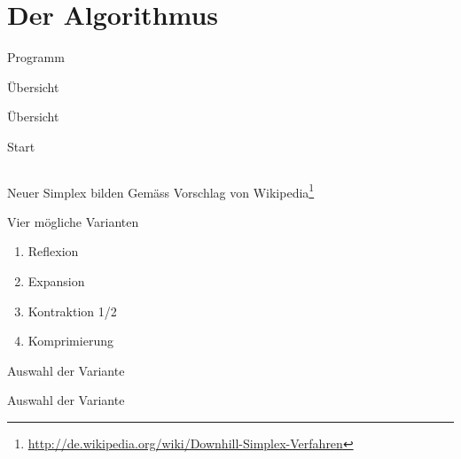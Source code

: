 \section{Der Algorithmus} 
\begin{frame}{Programm}\tableofcontents[currentsection]\end{frame}

\begin{frame}{Übersicht}
\newcommand{\highlight}{white}

\end{frame}
\begin{frame}{Übersicht}
\newcommand{\highlight}{green}

\end{frame}


\begin{frame}{Start}
\begin{columns}[c]
	\column[c]{5cm}{}
\end{columns}
\end{frame}


\begin{frame}{Neuer Simplex bilden}
Gemäss Vorschlag von Wikipedia\footnote{\url{http://de.wikipedia.org/wiki/Downhill-Simplex-Verfahren}}

Vier mögliche Varianten
\begin{enumerate}
\item Reflexion
\item Expansion
\item Kontraktion 1/2
\item Komprimierung
\end{enumerate}
\end{frame}

\begin{frame}{Auswahl der Variante}

\end{frame}
\begin{frame}{Auswahl der Variante}
\newcommand{\highlightref}{green}

\end{frame}

